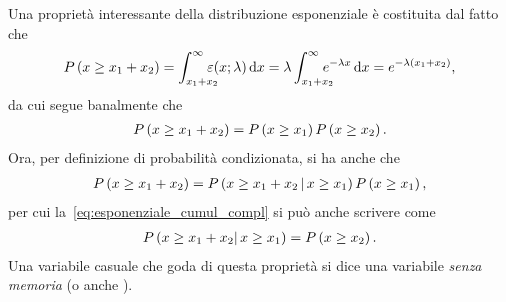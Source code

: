 Una proprietà interessante della distribuzione esponenziale è costituita
dal fatto che
\begin{align*}
  \prob{x \geq x_1 + x_2} =
  \int_{x_1 + x_2}^\infty\!\!\!\!\!\!\exponentialpdf[\lambda]{x}\diff =
  \lambda \int_{x_1 + x_2}^\infty\!\!\!\!\!\!e^{-\lambda x}\diff =
  e^{-\lambda (x_1 + x_2)},
\end{align*}
da cui segue banalmente che
\begin{align}\label{eq:esponenziale_cumul_compl}
  \displaystyle P\left(x \geq x_1 + x_2\right) = \displaystyle P\left(x \geq x_1\right)\displaystyle P\left(x \geq x_2\right).
\end{align}
Ora, per definizione di probabilità condizionata, si ha anche che
\begin{align*}
  \displaystyle P\left(x \geq x_1 + x_2\right) =
  \displaystyle P\left(x \geq x_1 + x_2 \,|\, x \geq x_1\right)\displaystyle P\left(x \geq x_1\right),
\end{align*}
per cui la~\eqref{eq:esponenziale_cumul_compl} si può anche scrivere come
\begin{align}\label{eq:esponenziale_assenza_memoria}
  \displaystyle P\left(x \geq x_1 + x_2 | \, x \geq x_1\right) = \displaystyle P\left(x \geq x_2\right).
\end{align}
Una variabile casuale che goda di questa proprietà si dice una variabile
\emph{senza memoria} (o anche ).



